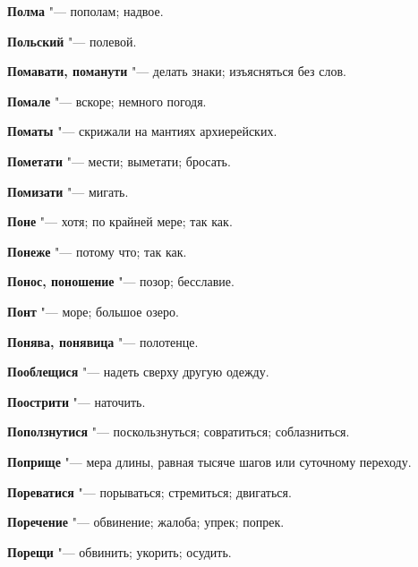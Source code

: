 \begin{mymulticols}{2}
\noindent\textbf{Полма} "--- пополам; надвое. 




\noindent\textbf{Польский} "--- полевой. 




\noindent\textbf{Помавати, поманути} "--- делать знаки; изъясняться без слов. 




\noindent\textbf{Помале} "--- вскоре; немного погодя. 




\noindent\textbf{Поматы} "--- скрижали на мантиях архиерейских. 




\noindent\textbf{Пометати} "--- мести; выметати; бросать. 




\noindent\textbf{Помизати} "--- мигать. 




\noindent\textbf{Поне} "--- хотя; по крайней мере; так как. 




\noindent\textbf{Понеже} "--- потому что; так как. 




\noindent\textbf{Понос, поношение} "--- позор; бесславие. 




\noindent\textbf{Понт} "--- море; большое озеро. 




\noindent\textbf{Понява, понявица} "--- полотенце. 




\noindent\textbf{Пооблещися} "--- надеть сверху другую одежду. 




\noindent\textbf{Поострити} "--- наточить. 




\noindent\textbf{Поползнутися} "--- поскользнуться; совратиться; соблазниться. 




\noindent\textbf{Поприще} "--- мера длины, равная тысяче шагов или суточному переходу. 




\noindent\textbf{Пореватися} "--- порываться; стремиться; двигаться. 




\noindent\textbf{Поречение} "--- обвинение; жалоба; упрек; попрек. 




\noindent\textbf{Порещи} "--- обвинить; укорить; осудить. 





\end{mymulticols}
